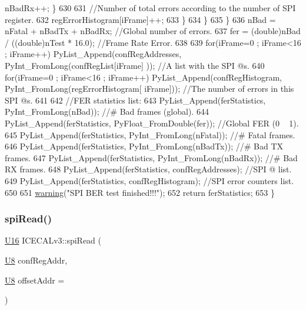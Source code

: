 \begin{DoxyCode}
      nBadRx++;    \}
630 
631                 \textcolor{comment}{//Number of total errors according to the number of SPI register.}
632                 regErrorHistogram[iFrame]++;
633             \}
634         \}
635     \}
636     nBad = nFatal + nBadTx + nBadRx;                            \textcolor{comment}{//Global number of errors.}
637     fer = (double)nBad / ((\textcolor{keywordtype}{double})nTest * 16.0);    \textcolor{comment}{//Frame Rate Error.}
638 
639     \textcolor{keywordflow}{for}(iFrame=0 ; iFrame<16 ; iFrame++) PyList\_Append(confRegAddresses, PyInt\_FromLong(confRegList[iFrame]
      ));              \textcolor{comment}{//A list with the SPI @s.}
640     \textcolor{keywordflow}{for}(iFrame=0 ; iFrame<16 ; iFrame++) PyList\_Append(confRegHistogram, PyInt\_FromLong(regErrorHistogram[
      iFrame]));    \textcolor{comment}{//The number of errors in this SPI @s.}
641 
642     \textcolor{comment}{//FER statistics list:}
643     PyList\_Append(ferStatistics, PyInt\_FromLong(nBad));         \textcolor{comment}{//# Bad frames (global).}
644     PyList\_Append(ferStatistics, PyFloat\_FromDouble(fer));  \textcolor{comment}{//Global FER (0 ~ 1).}
645     PyList\_Append(ferStatistics, PyInt\_FromLong(nFatal));       \textcolor{comment}{//# Fatal frames.}
646     PyList\_Append(ferStatistics, PyInt\_FromLong(nBadTx));       \textcolor{comment}{//# Bad TX frames.}
647     PyList\_Append(ferStatistics, PyInt\_FromLong(nBadRx));       \textcolor{comment}{//# Bad RX frames.}
648     PyList\_Append(ferStatistics, confRegAddresses);                 \textcolor{comment}{//SPI @ list.}
649     PyList\_Append(ferStatistics, confRegHistogram);                 \textcolor{comment}{//SPI error counters list.}
650 
651     \hyperlink{classObject_a65cd4fda577711660821fd2cd5a3b4c9}{warning}(\textcolor{stringliteral}{"SPI BER test finished!!!"});
652     \textcolor{keywordflow}{return} ferStatistics;
653 \}
\end{DoxyCode}
\mbox{\label{classICECALv3_aced41ce20a0853d6248b8df88412e57a}} 
\subsubsection{\texorpdfstring{spi\+Read()}{spiRead()}}
{\footnotesize\ttfamily \hyperlink{ICECALv3_8h_adf928e51a60dba0df29d615401cc55a8}{U16} I\+C\+E\+C\+A\+Lv3\+::spi\+Read (\begin{DoxyParamCaption}\item[{\hyperlink{ICECALv3_8h_a3cb25ca6f51f003950f9625ff05536fc}{U8}}]{conf\+Reg\+Addr,  }\item[{\hyperlink{ICECALv3_8h_a3cb25ca6f51f003950f9625ff05536fc}{U8}}]{offset\+Addr = {} }\end{DoxyParamCaption})\hspace{0.3cm}{\ttfamily [private]}}



